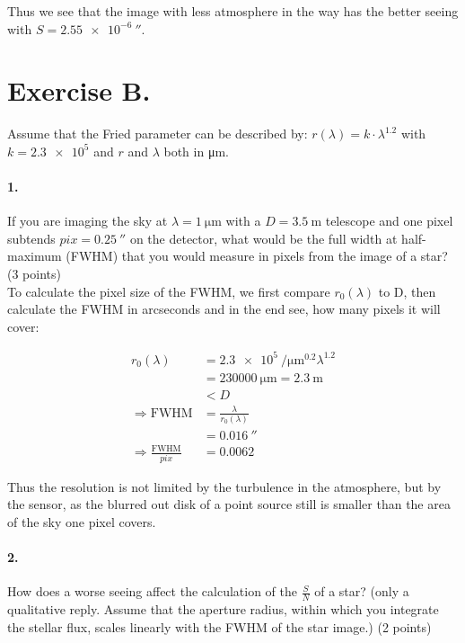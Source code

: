 \documentclass[11pt,a4paper,twoside]{article}
\newcommand{\SNR}{\ensuremath{\frac{S}{N}} }
\begin{document}
Thus we see that the image with less atmosphere in the way has the better
seeing with $S = \SI{2.55e-6}{\arcsecond}$. 


\section*{Exercise B.}
Assume that the Fried parameter can be described by:
$r(\lambda) = k \cdot \lambda^{1.2}$ with $k = \num{2.3e5}$ and $r$ and
$\lambda$ both in \si{\micro\meter}.

\paragraph{1.} If you are imaging the sky at $\lambda = \SI{1}{\micro\meter}$
with a $D = \SI{3.5}{\meter}$ telescope and one pixel subtends
$pix = \SI{0.25}{\arcsecond}$ on the detector, what would be the full width at
half-maximum (FWHM) that you would measure in pixels from the image of a star?
(3 points)\\

To calculate the pixel size of the FWHM, we first compare $r_0(\lambda)$ to D,
then calculate the FWHM in arcseconds and in the end see, how many pixels it
will cover:

\begin{align}
r_0(\lambda)    &= \SI{2.3e5}{\per\micro\meter\tothe{0.2}}\lambda^{1.2}  \\
                &= \SI{230000}{\micro\meter} = \SI{2.3}{\meter}         \\
                &< D                                                    \\
\Rightarrow 
\mathrm{FWHM}   &= \frac{\lambda}{r_0(\lambda)}                         \\
                &= \SI{0.016}{\arcsecond}                               \\
\Rightarrow
\frac{\mathrm{FWHM}}{pix} &= 0.0062
\end{align}

Thus the resolution is not limited by the turbulence in the atmosphere, but
by the sensor, as the blurred out disk of a point source still is smaller than
the area of the sky one pixel covers.


\paragraph{2.} How does a worse seeing affect the calculation of the \SNR of a
star? (only a qualitative reply. Assume that the aperture radius, within which
you integrate the stellar flux, scales linearly with the FWHM of the star
image.) (2 points) \\
\end{document}
